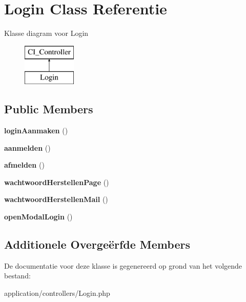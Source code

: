 \hypertarget{class_login}{}\section{Login Class Referentie}
\label{class_login}
Klasse diagram voor Login\begin{figure}[H]
\begin{center}
\leavevmode
\includegraphics[height=2.000000cm]{class_login}
\end{center}
\end{figure}
\subsection*{Public Members}
\begin{DoxyCompactItemize}
\item 
\mbox{\label{class_login_af1e578f30f714326576a1736edd50f92}} 
{\bfseries login\+Aanmaken} ()
\item 
\mbox{\label{class_login_a3206f822b47338a433dc7bc3863173b4}} 
{\bfseries aanmelden} ()
\item 
\mbox{\label{class_login_a9eea5cd6fc12307fadeb90b79c2df3e2}} 
{\bfseries afmelden} ()
\item 
\mbox{\label{class_login_a078e1338e730bccd63c481e88c391277}} 
{\bfseries wachtwoord\+Herstellen\+Page} ()
\item 
\mbox{\label{class_login_a458b940742f4aaf7751d5e68f5b7b840}} 
{\bfseries wachtwoord\+Herstellen\+Mail} ()
\item 
\mbox{\label{class_login_adb54070ab6a675712f67942dbb8dc3e1}} 
{\bfseries open\+Modal\+Login} ()
\end{DoxyCompactItemize}
\subsection*{Additionele Overge\"{e}rfde Members}


De documentatie voor deze klasse is gegenereerd op grond van het volgende bestand\+:\begin{DoxyCompactItemize}
\item 
application/controllers/Login.\+php\end{DoxyCompactItemize}
